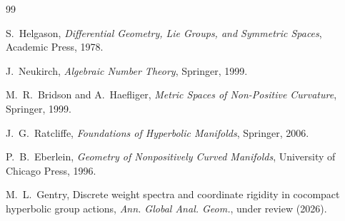 \documentclass[12pt]{article}
\theoremstyle{definition}
\theoremstyle{remark}
\begin{document}
\begin{thebibliography}{99}

S.~Helgason,
\emph{Differential Geometry, Lie Groups, and Symmetric Spaces},
Academic Press, 1978.

J.~Neukirch,
\emph{Algebraic Number Theory},
Springer, 1999.

M.~R.~Bridson and A.~Haefliger,
\emph{Metric Spaces of Non-Positive Curvature},
Springer, 1999.

J.~G.~Ratcliffe,
\emph{Foundations of Hyperbolic Manifolds},
Springer, 2006.

P.~B.~Eberlein,
\emph{Geometry of Nonpositively Curved Manifolds},
University of Chicago Press, 1996.


M.~L.~Gentry,
\newblock Discrete weight spectra and coordinate rigidity in cocompact
  hyperbolic group actions,
\newblock \emph{Ann. Global Anal. Geom.}, under review (2026).

\end{thebibliography}
\end{document}
